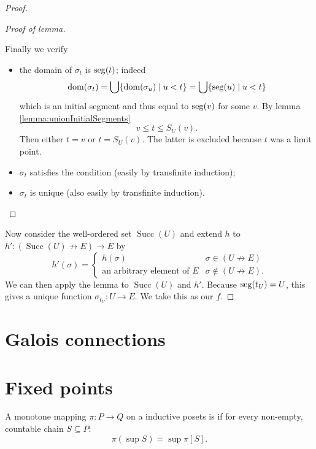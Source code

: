 \begin{proof}
\begin{proof}[Proof of lemma]
\begin{itemize}[leftmargin=2.5cm]
Finally we verify
\begin{itemize}
\item the domain of $\sigma_t$ is $\operatorname{seg}(t)$; indeed
\[ \operatorname{dom}(\sigma_t) = \bigcup\{\operatorname{dom}(\sigma_u)\;|\; u< t \} = \bigcup\{ \operatorname{seg}(u)\;|\; u<t \} \]
which is an initial segment and thus equal to $\operatorname{seg}(v)$ for some $v$. By lemma \ref{lemma:unionInitialSegments}
\[ v\leq t \leq S_U(v). \]
Then either $t=v$ or $t=S_U(v)$. The latter is excluded because $t$ was a limit point.
\item $\sigma_t$ satisfies the condition (easily by transfinite induction);
\item $\sigma_t$ is unique (also easily by transfinite induction).
\end{itemize}
\end{itemize}
\end{proof}

Now consider the well-ordered set $\operatorname{Succ}(U)$ and extend $h$ to $h': (\operatorname{Succ}(U)\not\to E) \to E$ by
\[ h'(\sigma) = \begin{cases}
h(\sigma) & \sigma\in (U\not\to E) \\
\text{an arbitrary element of $E$} & \sigma \notin (U\not\to E).
\end{cases} \]
We can then apply the lemma to $\operatorname{Succ}(U)$ and $h'$. Because $\operatorname{seg}(t_U) = U$, this gives a unique function $\sigma_{t_U}: U\to E$. We take this as our $f$.
\end{proof}

\section{Galois connections}



\section{Fixed points}

\begin{definition}
A monotone mapping $\pi : P \to Q$ on a inductive posets
 is  if for every non-empty, countable chain $S\subseteq P$:
 \[ \pi(\sup S) = \sup\pi[S]. \]
\end{definition}

